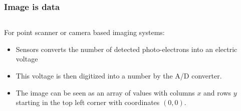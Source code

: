 \documentclass[ignorenonframetext,aspectratio=169,10pt,xcolor=table]{beamer}
\begin{document}
\begin{frame} \frametitle{Image is data}

  \begin{columns}
    \begin{column}{.6\textwidth}
      For point scanner or camera based imaging systems:\\[1em]
      \begin{itemize} \setlength\itemsep{1em}
      \item Sensors converts the number of detected photo-electrons
        into an electric voltage
      \item This voltage is then digitized into a number by the A/D
        converter.
      \item The image can be seen as an array of values with columns
        $x$ and rows $y$ starting in the top left corner with coordinates $(0,0)$.
      \end{itemize}
      \end{column}

    \begin{column}{.4\textwidth}
    \end{column}

  \end{columns}

\end{frame}
\end{document}
